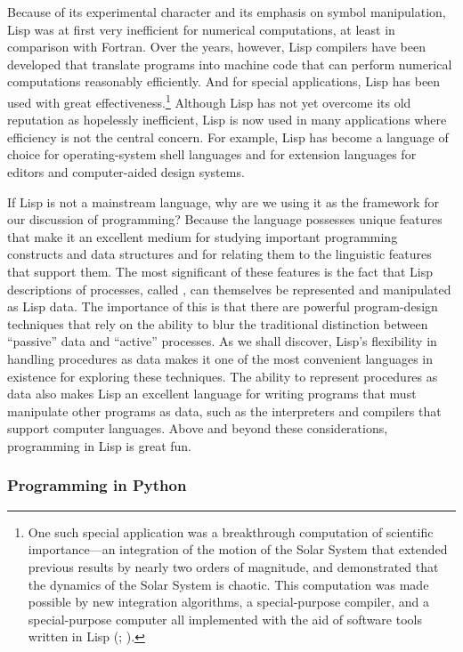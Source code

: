 Because of its experimental character and its emphasis on symbol manipulation,
Lisp was at first very inefficient for numerical computations, at least in
comparison with Fortran. Over the years, however, Lisp compilers have been
developed that translate programs into machine code that can perform numerical
computations reasonably efficiently. And for special applications, Lisp has
been used with great effectiveness.\footnote{One such special application was a
breakthrough computation of scientific importance---an integration of the
motion of the Solar System that extended previous results by nearly two orders
of magnitude, and demonstrated that the dynamics of the Solar System is
chaotic. This computation was made possible by new integration algorithms, a
special-purpose compiler, and a special-purpose computer all implemented with
the aid of software tools written in Lisp (; ).}
Although Lisp has not yet overcome its old reputation as
hopelessly inefficient, Lisp is now used in many applications where efficiency
is not the central concern. For example, Lisp has become a language of choice
for operating-system shell languages and for extension languages for editors
and computer-aided design systems.

If Lisp is not a mainstream language, why are we using it as the framework for
our discussion of programming? Because the language possesses unique features
that make it an excellent medium for studying important programming constructs
and data structures and for relating them to the linguistic features that
support them. The most significant of these features is the fact that Lisp
descriptions of processes, called , can themselves be
represented and manipulated as Lisp data. The importance of this is that there
are powerful program-design techniques that rely on the ability to blur the
traditional distinction between ``passive'' data and ``active'' processes. As
we shall discover, Lisp's flexibility in handling procedures as data makes it
one of the most convenient languages in existence for exploring these
techniques. The ability to represent procedures as data also makes Lisp an
excellent language for writing programs that must manipulate other programs as
data, such as the interpreters and compilers that support computer languages.
Above and beyond these considerations, programming in Lisp is great fun.

\subsubsection*{Programming in Python}

